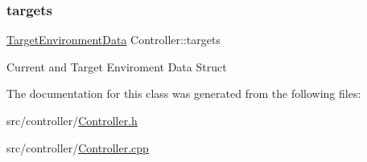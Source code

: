 \subsubsection{\texorpdfstring{targets}{targets}}
{\footnotesize\ttfamily \hyperlink{structTargetEnvironmentData}{Target\+Environment\+Data} Controller\+::targets\hspace{0.3cm}{\ttfamily [private]}}

Current and Target Enviroment Data Struct 

The documentation for this class was generated from the following files\+:\begin{DoxyCompactItemize}
\item 
src/controller/\hyperlink{Controller_8h}{Controller.\+h}\item 
src/controller/\hyperlink{Controller_8cpp}{Controller.\+cpp}\end{DoxyCompactItemize}
